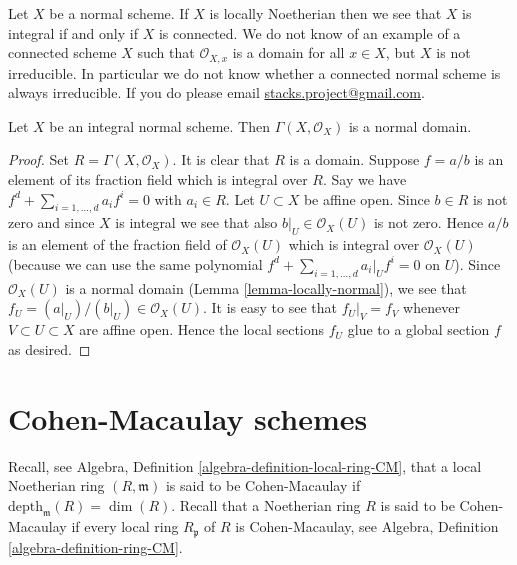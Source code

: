 \begin{remark}
\label{remark-normal-connected-irreducible}
Let $X$ be a normal scheme.
If $X$ is locally Noetherian then we see that $X$ is integral if and
only if $X$ is connected.
We do not know of an example of a connected scheme $X$ such that
$\mathcal{O}_{X, x}$ is a domain for all $x \in X$, but $X$ is not
irreducible. In particular we do not know whether a connected normal scheme
is always irreducible. If you do please email
\href{mailto:stacks.project@gmail.com}{stacks.project@gmail.com}.
\end{remark}

\begin{lemma}
\label{lemma-normal-integral-sections}
Let $X$ be an integral normal scheme.
Then $\Gamma(X, \mathcal{O}_X)$ is a normal domain.
\end{lemma}

\begin{proof}
Set $R = \Gamma(X, \mathcal{O}_X)$.
It is clear that $R$ is a domain.
Suppose $f = a/b$ is an element of its fraction field
which is integral over $R$. Say we have
$f^d + \sum_{i = 1, \ldots, d} a_i f^i = 0$ with
$a_i \in R$. Let $U \subset X$ be affine open.
Since $b \in R$ is not zero and since $X$ is integral we see
that also $b|_U \in \mathcal{O}_X(U)$ is not zero.
Hence $a/b$ is an element of the fraction field of
$\mathcal{O}_X(U)$ which is integral over $\mathcal{O}_X(U)$
(because we can use the same polynomial
$f^d + \sum_{i = 1, \ldots, d} a_i|_U f^i = 0$ on $U$).
Since $\mathcal{O}_X(U)$ is a normal domain
(Lemma \ref{lemma-locally-normal}), we see that
$f_U = (a|_U)/(b|_U) \in \mathcal{O}_X(U)$. It is easy to
see that $f_U|_V = f_V$ whenever $V \subset U \subset X$ are
affine open. Hence the local sections $f_U$ glue to a global
section $f$ as desired.
\end{proof}










\section{Cohen-Macaulay schemes}
\label{section-Cohen-Macaulay}

\noindent
Recall, see Algebra, Definition \ref{algebra-definition-local-ring-CM},
that a local Noetherian ring $(R, \mathfrak m)$ is
said to be Cohen-Macaulay if $\text{depth}_{\mathfrak m}(R) = \dim(R)$.
Recall that a Noetherian ring $R$ is said to be Cohen-Macaulay if
every local ring $R_{\mathfrak p}$ of $R$ is Cohen-Macaulay,
see Algebra, Definition \ref{algebra-definition-ring-CM}.

